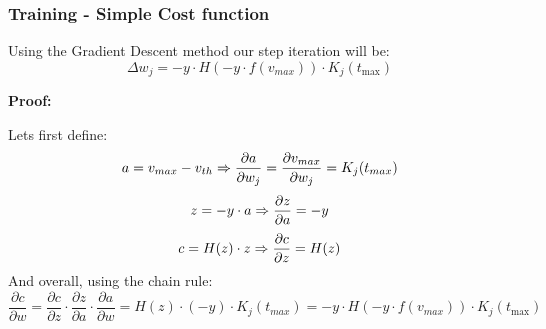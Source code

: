 \subsubsection{Training - Simple Cost function}

\label{sssec:training-simple-cost}

\begin{mdframed}[backgroundcolor=red_background, linecolor=black, linewidth=2pt, frametitle=\textbf{Statement}]
\begin{center}

    \label{st:GD-simple-medel}
    Using the Gradient Descent method our step iteration will be:
    \begin{equation}
        \Delta w_j = -y \cdot H(-y \cdot f(v_{max})) \cdot K_j(t_{\text{max}})
    \end{equation}

\end{center}
\end{mdframed}

\textbf{Proof:}

Lets first define:
\begin{equation} \notag
    a = v_{max}-v_{th} \Rightarrow \frac{\partial{a}}{\partial{w_j}} = \frac{\partial{v_{max}}}{\partial{w_j}} = K_j(t_{max})
\end{equation}
\begin{equation} \notag
    z = -y \cdot a \Rightarrow \frac{\partial{z}}{\partial{a}} = -y
\end{equation}
\begin{equation} \notag
    c = H(z) \cdot z \Rightarrow \frac{\partial{c}}{\partial{z}} = H(z)
\end{equation}
And overall, using the chain rule:
\begin{equation}
    \frac{\partial{c}}{\partial{w}} = \frac{\partial{c}}{\partial{z}} \cdot \frac{\partial{z}}{\partial{a}} \cdot \frac{\partial{a}}{\partial{w}} = H(z) \cdot (-y) \cdot K_j(t_{max}) = -y \cdot H(-y \cdot f(v_{max})) \cdot K_j(t_{\text{max}})
\end{equation}

